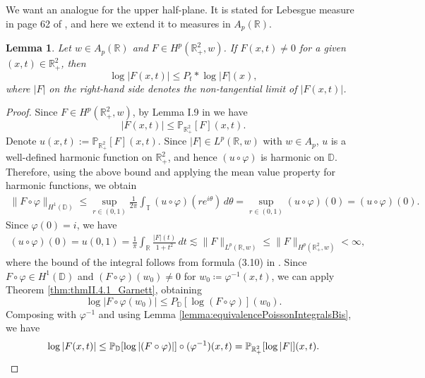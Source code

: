 \documentclass[12pt]{amsart}
\newcommand{\R}{\mathbb{R}}
\theoremstyle{plain}
\newtheorem{lemma}[theorem]{Lemma}
\theoremstyle{definition}
\numberwithin{equation}{section}
\begin{document}
We want an analogue for the upper half-plane. It is stated for Lebesgue measure in page 62 of \cite{garnett}, and here we extend it to measures in $A_p(\R)$. 


\begin{lemma}\label{thm:teoremaGarnettAdaptado}
    Let $w\in A_p(\mathbb{R})$ and $F\in H^p(\R_{+}^{2},w)$. If $F(x,t)\neq 0$ for a given $(x,t)\in\R_{+}^{2}$, then
    \[
    \log{|F(x,t)|}
    \leq 
    P_t\ast \log{|F|}(x),
    \]
    where $|F|$ on the right-hand side denotes the non-tangential limit of $|F(x,t)|$.
\end{lemma}

\begin{proof}
    Since $F\in H^p(\R_{+}^{2},w)$, by Lemma I.9 in \cite{GarciaCuerva} we have
    \[
    |F(x,t)| 
    \leq 
    \mathbb{P}_{\R_{+}^{2}}[F](x,t).
    \]
    Denote $u(x,t):= \mathbb{P}_{\R_{+}^{2}}[F](x,t)$. Since $|F|\in L^p(\R,w)$ with $w\in A_p$, $u$ is a well-defined harmonic function on $\R_{+}^{2}$, and hence $(u\circ\varphi)$ is harmonic on $\mathbb{D}$. Therefore, using the above bound and applying the mean value property for harmonic functions, we obtain
    \begin{align*}
        \|F\circ\varphi\|_{H^1(\mathbb{D})}
        \leq 
        \sup_{r\in (0,1)}\frac{1}{2\pi}\int_{\mathbb{T}}(u\circ\varphi)(re^{i\theta})\, d\theta 
        =%
        \sup_{r\in (0,1)}(u\circ\varphi)(0)
        =
        (u\circ\varphi)(0).
    \end{align*}
    Since $\varphi(0)=i$, we have
    \begin{align*}
        (u\circ\varphi)(0)
        =
        u(0,1)
        =
        \frac{1}{\pi}\int_{\R}\frac{|F|(t)}{1+t^2}\, dt
        \lesssim 
        \|F\|_{L^p(\R,w)}
        \leq 
        \|F\|_{H^p(\R_{+}^{2},w)}
        <
        \infty,
    \end{align*}
    where the bound of the integral follows from formula (3.10) in \cite{CNO}. Since $F\circ\varphi\in H^1(\mathbb{D})$ and $(F\circ\varphi)(w_0)\neq 0$ for $w_0\coloneqq \varphi^{-1}(x,t)$, we can apply Theorem \ref{thm:thmII.4.1_Garnett}, obtaining
    \[
    \log{|F\circ\varphi(w_0)|}
    \leq 
    P_{\mathbb{D}}[\log{(F\circ\varphi)}](w_0).
    \]
    Composing with $\varphi^{-1}$
    and using Lemma \ref{lemma:equivalencePoissonIntegralsBis}, we have
    \[
    \log{|F(x,t)|}
    \leq 
    \mathbb{P}_{\mathbb{D}}[\log{|(F\circ\varphi)|}]\circ(\varphi^{-1})(x,t)
    =
    \mathbb{P}_{\R_{+}^{2}}[\log{|F|}](x,t).\qedhere
    \]
\end{proof}
\end{document}
